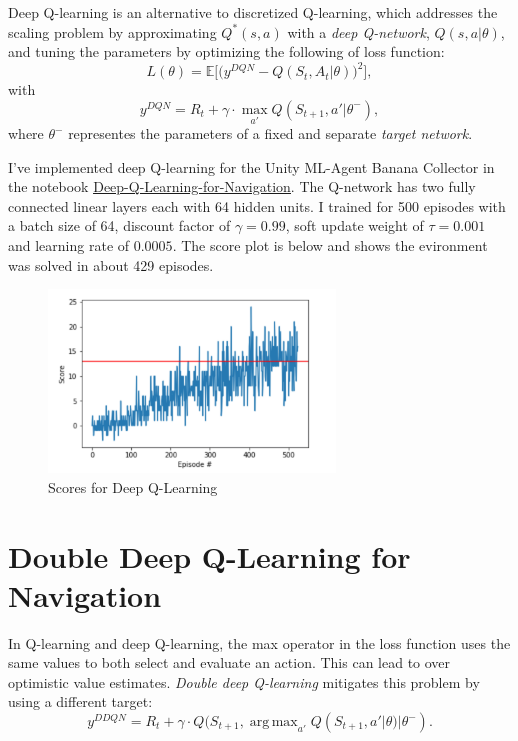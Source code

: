 \documentclass[tog]{acmsiggraph}
\begin{document}
Deep Q-learning is an alternative to discretized Q-learning, which addresses the scaling problem by approximating $Q^*(s,a)$ 
with a {\em deep Q-network}, $Q(s,a|\theta)$, and tuning the parameters by optimizing the following
of loss function:
$$L(\theta) = \mathbb{E}\big[\big(y^{DQN}-Q(S_t, A_t|\theta)\big)^2\big],$$
with 
$$ y^{DQN}=R_t+\gamma\cdot\max_{a'}Q(S_{t+1},a'|\theta^-),$$
where $\theta^-$ representes the parameters of a fixed and separate {\em target network}.

I've implemented deep Q-learning for the Unity ML-Agent Banana Collector in the notebook 
\href{https://nbviewer.jupyter.org/github/bobflagg/Deep-Q-Learning-for-Navigation/blob/master/01-Deep-Q-Learning-for-Navigation.ipynb}{\underline{Deep-Q-Learning-for-Navigation}}.
The Q-network has two fully connected linear layers each with 64 hidden units.   I trained for 500 episodes with a batch size of 64, discount factor of $\gamma = 0.99$, soft update weight of $\tau = 0.001$ and learning rate of $0.0005$.  The score plot is below and shows the evironment was solved in about 429 episodes.

\FloatBarrier
\begin{figure}[h]
	\centering
	\includegraphics[width=3.0in]{images/dqn-scores}
	\caption{Scores for Deep Q-Learning}
	\label{fig:dqn-scores}
\end{figure}
\FloatBarrier

\section{ Double Deep Q-Learning for Navigation}

In Q-learning and deep Q-learning, the max operator in the loss function uses the same values to both select and evaluate an action. 
This can lead to over optimistic value estimates.  {\em Double deep Q-learning} mitigates this problem by using a different target:
$$ y^{DDQN}=R_t+\gamma\cdot Q(S_{t+1},  \operatorname{arg\,max}_{a'} Q(S_{t+1}, a'|\theta)|\theta^-).$$
\end{document}
